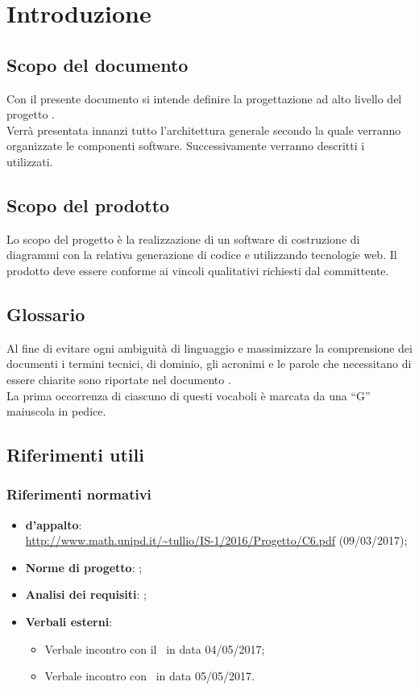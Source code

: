 \documentclass[../PianoDiQualifica.tex]{subfiles}
\begin{document}
	\section{Introduzione}
		\subsection{Scopo del documento} 
			Con il presente documento si intende definire la progettazione ad alto livello
			del progetto \progetto.\\
			Verrà presentata innanzi tutto l'architettura generale secondo la quale verranno
			organizzate le componenti software. Successivamente verranno descritti
			i  utilizzati.
		\subsection{Scopo del prodotto}
			Lo scopo del progetto è la realizzazione di un software di
			costruzione di diagrammi  con la relativa generazione
			di codice  e  utilizzando tecnologie
			web. Il prodotto deve essere conforme ai vincoli qualitativi
			richiesti dal committente.
		\subsection{Glossario}
			Al fine di evitare ogni ambiguità di linguaggio e massimizzare la
			comprensione dei documenti i termini tecnici, di dominio, gli
			acronimi e le parole che necessitano di essere chiarite sono
			riportate nel documento \glossariov.\\
			La prima occorrenza di ciascuno di questi vocaboli è
			marcata da una ``G'' maiuscola in pedice.
		\subsection{Riferimenti utili}
			\subsubsection{Riferimenti normativi}
    			\begin{itemize}
    				\item \textbf{ d'appalto}:\\
    				\url{http://www.math.unipd.it/~tullio/IS-1/2016/Progetto/C6.pdf} (09/03/2017);
    				\item \textbf{Norme di progetto}: \normediprogettov;
    				\item \textbf{Analisi dei requisiti}: \analisideirequisitiv;
    				\item \textbf{Verbali esterni}:
    				\begin{itemize}
    					\item Verbale incontro con il \cardin\ in data 04/05/2017;
    					\item Verbale incontro con \proponente\ in data 05/05/2017.
    				\end{itemize}
				\end{itemize}
\end{document}
